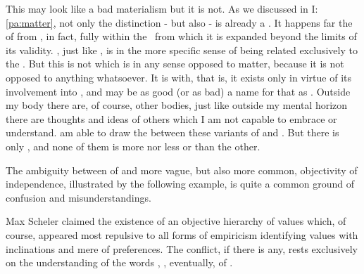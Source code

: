 {This may look like a bad materialism but it is not.
As we discussed in I:\ref{pa:matter}, not only the distinction
- but also - is already a
. It happens far  the  of 
from , in fact, fully within the \hoa\ from which it is expanded beyond
the limits of its validity.  , just like , is  in
the more specific sense of being related exclusively to the . But this is not  which is in any sense opposed
to matter, because it is not opposed to anything whatsoever. It is
 with, that is, it exists only in virtue of its involvement into
, and  may be as good (or as bad) a name for that
as . Outside my body there are, of course, other bodies, just like
outside my mental horizon there are thoughts and ideas of others which I am not
capable to embrace or understand.  am able to draw the 
between these variants of  and . But 
 there is only , and none of them is more nor less
 or  than the other.
}

\label{pa:allsubjective}
The ambiguity between  of  and more vague,
but also more common, {objectivity} of independence, illustrated by the
following example, is quite a common ground of confusion and misunderstandings.

Max Scheler claimed the existence of an {objective} hierarchy of values which,
of course, appeared most repulsive to all forms of empiricism identifying values
with  inclinations and mere  of preferences.   The conflict, if there is any, rests exclusively on the
understanding of the words , , eventually, of
.

